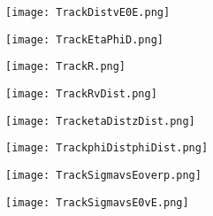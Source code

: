 \documentclass{beamer}
\begin{document}
\begin{frame}
  \begin{figure}[h!]
  \centering
  \texttt{[image: TrackDistvE0E.png]}
  \end{figure}
\end{frame}

\begin{frame}
  \begin{figure}[h!]
  \centering
  \texttt{[image: TrackEtaPhiD.png]}
  \end{figure}
\end{frame}

\begin{frame}
  \begin{figure}[h!]
  \centering
  \texttt{[image: TrackR.png]}
  \end{figure}
\end{frame}

\begin{frame}
  \begin{figure}[h!]
  \centering
  \texttt{[image: TrackRvDist.png]}
  \end{figure}
\end{frame}

\begin{frame}
  \begin{figure}[h!]
  \centering
  \texttt{[image: TracketaDistzDist.png]}
  \end{figure}
\end{frame}

\begin{frame}
  \begin{figure}[h!]
  \centering
  \texttt{[image: TrackphiDistphiDist.png]}
  \end{figure}
\end{frame}

\begin{frame}
  \begin{figure}[h!]
  \centering
  \texttt{[image: TrackSigmavsEoverp.png]}
  \end{figure}
\end{frame}

\begin{frame}
  \begin{figure}[h!]
  \centering
  \texttt{[image: TrackSigmavsE0vE.png]}
  \end{figure}
\end{frame}
\end{document}
